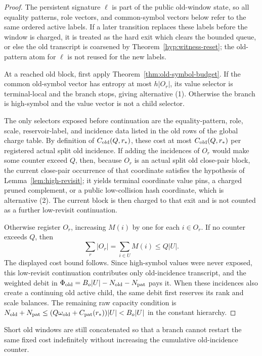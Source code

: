 \documentclass[11pt]{article}
\begin{document}
\begin{proof}
The persistent signature $\ell$ is part of the public old-window state, so all equality
patterns, role vectors, and common-symbol vectors below refer to the same
ordered active labels.  If a later transition replaces these labels before the
window is charged, it is treated as the hard exit which clears the bounded
queue, or else the old transcript is coarsened by
Theorem~\ref{hyp:witness-reset}; the old-pattern atom for $\ell$ is not reused
for the new labels.

At a reached old block, first apply Theorem~\ref{thm:old-symbol-budget}.  If the
common old-symbol vector has entropy at most $h|O_r|$, its value selector is
terminal-local and the branch stops, giving alternative (1).  Otherwise the
branch is high-symbol and the value vector is not a child selector.

The only selectors exposed before continuation are the equality-pattern, role,
scale, reservoir-label, and incidence data listed in the old rows of the global
charge table.  By definition of $C_{\rm old}(Q,r_*)$, these cost at most
$C_{\rm old}(Q,r_*)$ per registered actual split old incidence.  If adding the
incidences of $O_r$ would make some counter exceed $Q$, then, because $O_r$ is
an actual split old close-pair block, the current close-pair occurrence of
that coordinate satisfies the hypothesis of Lemma~\ref{lem:high-revisit}; it
yields terminal coordinate value pins, a charged pruned complement, or a public
low-collision hash coordinate, which is alternative (2).  The current block is
then charged to that exit and is not counted as a further low-revisit
continuation.

Otherwise register $O_r$, increasing $M(i)$ by one for each $i\in O_r$.  If no
counter exceeds $Q$, then
\[
  \sum_{r}|O_r|=\sum_{i\in U}M(i)\le Q|U|.
\]
The displayed cost bound follows.  Since high-symbol values were never exposed,
this low-revisit continuation contributes only old-incidence transcript, and
the weighted debit in $\Phi_{\rm old}=B_o|U|-N_{\rm old}-N_{\rm pat}$ pays it.
When these
incidences also create a continuing old active child, the same debit first
reserves its rank and scale balances.  The remaining raw capacity condition is
$N_{\rm old}+N_{\rm pat}
\le (Q\omega_{\rm old}+C_{\rm pat}(r_*))|U|<B_o|U|$
in the constant hierarchy.
\end{proof}

Short old windows are still concatenated so that a branch cannot restart the
same fixed cost indefinitely without increasing the cumulative old-incidence
counter.
\end{document}
